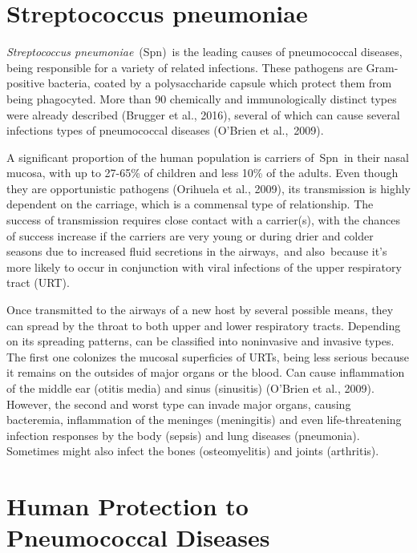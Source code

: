 \documentclass[
]{book}
\begin{document}
\hypertarget{streptococcus-pneumoniae}{%
\section{Streptococcus pneumoniae}\label{streptococcus-pneumoniae}}

\emph{Streptococcus pneumoniae}~(Spn)~is the leading causes of pneumococcal diseases, being responsible for a variety of related infections. These pathogens are Gram-positive bacteria, coated by a polysaccharide capsule which protect them from being phagocyted. More than 90 chemically and immunologically distinct types were already described (Brugger et al., 2016), several of which can cause several infections types of pneumococcal diseases (O'Brien et al.,~2009)⁠.

A significant proportion of the human population is carriers of~Spn~in their nasal mucosa, with up to 27-65\% of children and less 10\% of the adults. Even though they are opportunistic pathogens (Orihuela et al., 2009), its transmission is highly dependent on the carriage, which is a commensal type of relationship. The success of transmission requires close contact with a carrier(s), with the chances of success increase if the carriers are very young or during drier and colder seasons due to increased fluid secretions in the airways,~and also~because it's more likely to occur in conjunction with viral infections of the upper respiratory tract (URT).

Once transmitted to the airways of a new host by several possible means, they can spread by the throat to both upper and lower respiratory tracts. Depending on its spreading patterns, can be classified into noninvasive and invasive types. The first one colonizes the mucosal superficies of URTs, being less serious because it remains on the outsides of major organs or the blood. Can cause inflammation of the middle ear (otitis media) and sinus (sinusitis) (O'Brien et al., 2009). However, the second and worst type can invade major organs, causing bacteremia, inflammation of the meninges (meningitis) and even life-threatening infection responses by the body (sepsis) and lung diseases (pneumonia). Sometimes might also infect the bones (osteomyelitis) and joints (arthritis).

\hypertarget{human-protection-to-pneumococcal-diseases}{%
\section{Human Protection to Pneumococcal Diseases}\label{human-protection-to-pneumococcal-diseases}}
\end{document}
